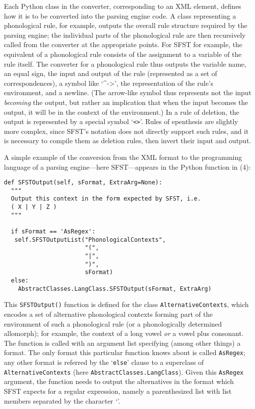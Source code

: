 Each Python class in the converter, corresponding to an XML element, defines how it is to be converted into the parsing engine code. A class representing a phonological rule, for example, outputs the overall rule structure required by the parsing engine; the individual parts of the phonological rule are then recursively called from the converter at the appropriate points. For SFST for example, the equivalent of a phonological rule consists of the assignment to a variable of the rule itself. The converter for a phonological rule thus outputs the variable name, an equal sign, the input and output of the rule (represented as a set of correspondences), a symbol like `\^{}-{\textgreater}', the representation of the rule's environment, and a newline. (The arrow-like symbol thus represents not the input \textit{becoming }the output, but rather an implication that when the input becomes the output, it will be in the context of the environment.) In a rule of deletion, the output is represented by a special symbol `\texttt{{\textless}{\textgreater}}'. Rules of epenthesis are slightly more complex, since SFST's notation does not directly support such rules, and it is necessary to compile them as deletion rules, then invert their input and output.

A simple example of the conversion from the XML format to the programming language of a parsing engine---here SFST---appears in the Python function in (4):

\ea
\begin{verbatim}
def SFSTOutput(self, sFormat, ExtraArg=None):
  """
  Output this context in the form expected by SFST, i.e.
  ( X | Y | Z ) 
  """

  if sFormat == 'AsRegex':
   self.SFSTOutputList("PhonologicalContexts", 
                       "(", 
                       "|", 
                       ")", 
                       sFormat)
  else:
    AbstractClasses.LangClass.SFSTOutput(sFormat, ExtraArg)
\end{verbatim}
\z

This \texttt{SFSTOutput()} function is defined for the class \texttt{AlternativeContexts}, which encodes a set of alternative phonological contexts forming part of the environment of such a phonological rule (or a phonologically determined allomorph); for example, the context of a long vowel {\textit{or}} a vowel plus consonant. The function is called with an argument list specifying (among other things) a format. The only format this particular function knows about is called \texttt{AsRegex}; any other format is referred by the `\texttt{else}' clause to a superclass of \texttt{AlternativeContexts} (here \texttt{AbstractClasses.}\texttt{LangClass}). Given this \texttt{AsRegex} argument, the function needs to output the alternatives in the format which SFST expects for a regular expression, namely a parenthesized list with list members separated by the character `{\textbar}'. 

